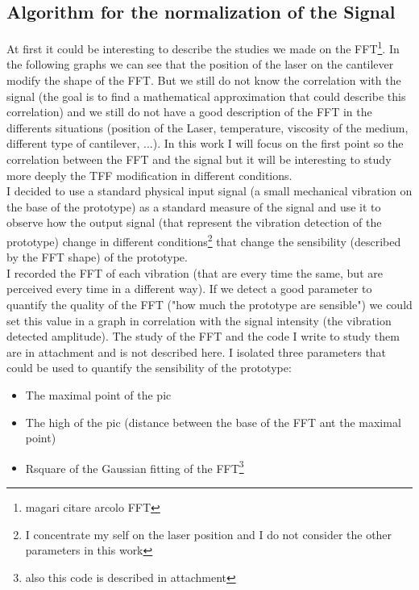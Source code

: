 \documentclass[11pt, a4paper]{article}
\begin{document}
\subsection{Algorithm for the normalization of the Signal}%
At first it could be interesting to describe the studies we made on the FFT\footnote{magari citare arcolo FFT}. In the following graphs %
we can see that the position of the laser on the cantilever modify the shape of the FFT. %
But we still do not know the correlation with the signal (the goal is to find a mathematical approximation that could describe this correlation) and we still do not have a good description of the FFT in the differents situations (position of the Laser, temperature, viscosity of the medium, different type of cantilever, ...).
In this work I will focus on the first point so the correlation between the FFT and the signal but it will be interesting to study more deeply the TFF modification in different conditions. %
\\I decided to use a standard physical input signal (a small mechanical vibration on the base of the prototype) as a standard measure of the signal and use it to observe how the output signal (that represent the vibration detection of the prototype) change in different conditions\footnote{I concentrate my self on the laser position and I do not consider the other parameters in this work} that change the sensibility (described by the FFT shape) of the prototype.
\\%
I recorded the FFT of each vibration (that are every time the same, but are perceived every time in a different way). If we detect a good parameter to quantify the quality of the FFT ("how much the prototype are sensible") we could set this value in a graph in correlation with the signal intensity (the vibration detected amplitude). The study of the FFT and the code I write to study them are in attachment and is not described here. I isolated three parameters that could be used to quantify the sensibility of the prototype: 

\begin{itemize}
\item The maximal point of the pic
\item The high of the pic (distance between the base of the FFT ant the maximal point)
\item Rsquare of the Gaussian fitting of the FFT\footnote{also this code is described in attachment}
\end{itemize}
\end{document}
